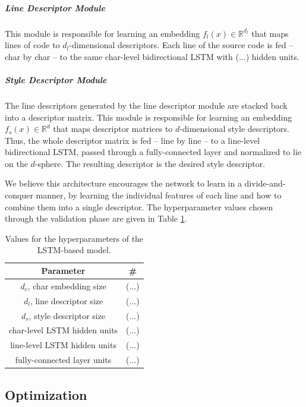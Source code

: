 \subparagraph*{Line Descriptor Module} 

This module is responsible for learning an embedding $f_l(x) \in \mathbb{R}^{d_l}$ that maps lines of code to $d_l$-dimensional descriptors. Each line of the source code is fed -- char by char -- to the same char-level bidirectional LSTM with (...) hidden units.

\subparagraph*{Style Descriptor Module}

The line descriptors generated by the line descriptor module are stacked back into a descriptor matrix. This module is responsible for learning an embedding $f_s(x) \in \mathbb{R}^d$ that maps descriptor matrices to $d$-dimensional style descriptors. Thus, the whole descriptor matrix is fed -- line by line -- to a line-level bidirectional LSTM, passed through a fully-connected layer and normalized to lie on the $d$-sphere. The resulting descriptor is the desired style descriptor.

We believe this architecture encourages the network to learn in a divide-and-conquer manner, by learning the individual features of each line and how to combine them into a single descriptor. The hyperparameter values chosen through the validation phase are given in Table \ref{tab:lstm_hyper}.

\begin{table}[htbp]
	\centering
	\begin{tabular}{|c|l|}
		\hline
		\textbf{Parameter}           & \multicolumn{1}{c|}{\textbf{\#}} \\ \hline
		$d_c$, char embedding size   & (...)                            \\ \hline
		$d_l$, line descriptor size  & (...)                            \\ \hline
		$d_s$, style descriptor size & (...)                            \\ \hline
		char-level LSTM hidden units & (...)                            \\ \hline
		line-level LSTM hidden units & (...)                            \\ \hline
		fully-connected layer units  & (...)                            \\ \hline
	\end{tabular}
	\caption{Values for the hyperparameters of the LSTM-based model.}
	\label{tab:lstm_hyper}
\end{table}

\subsection{Optimization}\label{sec:optimization}


